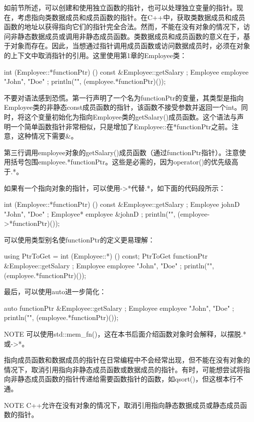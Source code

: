 如前节所述，可以创建和使用独立函数的指针，也可以处理独立变量的指针。现在，考虑指向类数据成员和成员函数的指针。在C++中，获取类数据成员和成员函数的地址以获得指向它们的指针完全合法。然而，不能在没有对象的情况下，访问非静态数据成员或调用非静态成员函数。类数据成员和成员函数的意义在于，基于对象而存在。因此，当想通过指针调用成员函数或访问数据成员时，必须在对象的上下文中取消指针的引用。这里使用第1章的Employee类：

\begin{cpp}
int (Employee::*functionPtr) () const { &Employee::getSalary };
Employee employee { "John", "Doe" };
println("{}", (employee.*functionPtr)());
\end{cpp}

不要对语法感到恐慌。第一行声明了一个名为functionPtr的变量，其类型是指向Employee类的非静态const成员函数的指针，该函数不接受参数并返回一个int。同时，将这个变量初始化为指向Employee类的getSalary()成员函数。这个语法与声明一个简单函数指针非常相似，只是增加了Employee::在*functionPtr之前。注意，这种情况下需要\&。

第三行调用employee对象的getSalary()成员函数（通过functionPtr指针）。注意使用括号包围employee.*functionPtr。这些是必需的，因为operator()的优先级高于.*。

如果有一个指向对象的指针，可以使用->*代替.*，如下面的代码段所示：

\begin{cpp}
int (Employee::*functionPtr) () const { &Employee::getSalary };
Employee johnD { "John", "Doe" };
Employee* employee { &johnD };
println("{}", (employee->*functionPtr)());
\end{cpp}

可以使用类型别名使functionPtr的定义更易理解：

\begin{cpp}
using PtrToGet = int (Employee::*) () const;
PtrToGet functionPtr { &Employee::getSalary };
Employee employee { "John", "Doe" };
println("{}", (employee.*functionPtr)());
\end{cpp}

最后，可以使用auto进一步简化：

\begin{cpp}
auto functionPtr { &Employee::getSalary };
Employee employee { "John", "Doe" };
println("{}", (employee.*functionPtr)());
\end{cpp}

\begin{myNotic}{NOTE}
可以使用std::mem\_fn()，这在本书后面介绍函数对象时会解释，以摆脱.*或->*。
\end{myNotic}

指向成员函数和数据成员的指针在日常编程中不会经常出现，但不能在没有对象的情况下，取消引用指向非静态成员函数或数据成员的指针。有时，可能想尝试将指向非静态成员函数的指针传递给需要函数指针的函数，如qsort()，但这根本行不通。

\begin{myNotic}{NOTE}
C++允许在没有对象的情况下，取消引用指向静态数据成员或静态成员函数的指针。
\end{myNotic}













